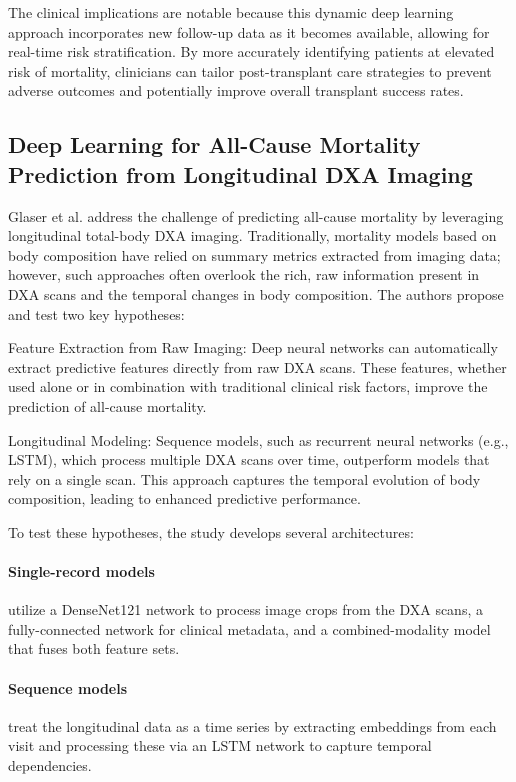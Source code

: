 \documentclass[acmsmall]{acmart}
\begin{document}
The clinical implications are notable because this dynamic deep learning approach incorporates new follow-up data as it becomes available, allowing for real-time risk stratification. By more accurately identifying patients at elevated risk of mortality, clinicians can tailor post-transplant care strategies to prevent adverse outcomes and potentially improve overall transplant success rates.


\subsection{Deep Learning for All-Cause Mortality Prediction from Longitudinal DXA Imaging}

Glaser et al. \cite{glaser2022deep} address the challenge of predicting all-cause mortality by leveraging longitudinal total-body DXA imaging. Traditionally, mortality models based on body composition have relied on summary metrics extracted from imaging data; however, such approaches often overlook the rich, raw information present in DXA scans and the temporal changes in body composition. The authors propose and test two key hypotheses:

 Feature Extraction from Raw Imaging: Deep neural networks can automatically extract predictive features directly from raw DXA scans. These features, whether used alone or in combination with traditional clinical risk factors, improve the prediction of all-cause mortality.

Longitudinal Modeling: Sequence models, such as recurrent neural networks (e.g., LSTM), which process multiple DXA scans over time, outperform models that rely on a single scan. This approach captures the temporal evolution of body composition, leading to enhanced predictive performance.


To test these hypotheses, the study develops several architectures:

 \paragraph{Single-record models} utilize a DenseNet121 network to process image crops from the DXA scans, a fully-connected network for clinical metadata, and a combined-modality model that fuses both feature sets.
 
 \paragraph{Sequence models} treat the longitudinal data as a time series by extracting embeddings from each visit and processing these via an LSTM network to capture temporal dependencies.
\end{document}
